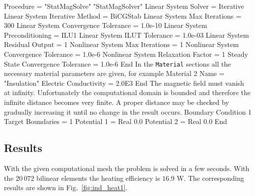   Procedure = "StatMagSolve" "StatMagSolver"
  Linear System Solver = Iterative
  Linear System Iterative Method = BiCGStab
  Linear System Max Iterations = 300
  Linear System Convergence Tolerance = 1.0e-10
  Linear System Preconditioning = ILU1
  Linear System ILUT Tolerance = 1.0e-03
  Linear System Residual Output = 1
  Nonlinear System Max Iterations = 1
  Nonlinear System Convergence Tolerance = 1.0e-6
  Nonlinear System Relaxation Factor = 1
  Steady State Convergence Tolerance = 1.0e-6
End
\ttend
%
In the \texttt{Material} sections all the necessary 
material parameters are given, for example
\ttbegin
Material 2
  Name = "Insulation"
  Electric Conductivity = 2.0E3
End
\ttend
%
The magnetic field must vanish at infinity. Unfortunately the
computational domain is bounded and therefore the infinite
distance becomes very finite. A proper distance may be checked
by gradually increasing it until no change in the result occurs.
%
\ttbegin
Boundary Condition 1
  Target Boundaries = 1
  Potential 1 = Real 0.0
  Potential 2 = Real 0.0
End
\ttend

\subsection*{Results}

With the given computational mesh the problem is solved in 
a few seconds. With the 20\,072 bilinear elements the heating
efficiency is $16.9$ W. The corresponding results are shown
in Fig.~\ref{fig:ind_heat1}.

